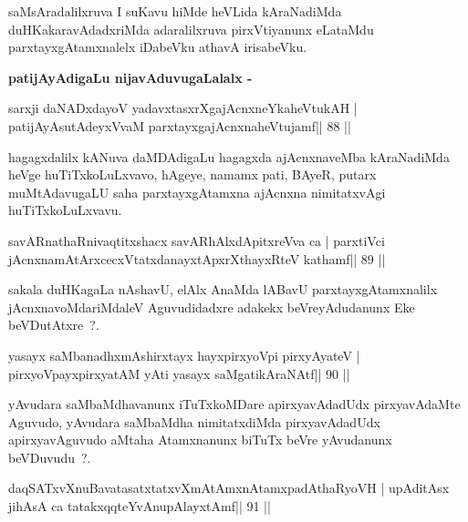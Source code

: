 \begin{artha}
saMsAradalilxruva I suKavu hiMde heVLida kAraNadiMda duHKakaravAdadxriMda adaralilxruva pirxVtiyanunx eLataMdu parxtayxgAtamxnalelx iDabeVku athavA irisabeVku.
\end{artha}

\begin{artha}
\textbf{patijAyAdigaLu nijavAduvugaLalalx -}
\end{artha}

\begin{shl}
sarxji daNADxdayoV yadavxtasxrXgajAcnxneYkaheVtukAH |
patijAyAsutAdeyxVvaM parxtayxgajAcnxnaheVtujamf\hfill || 88 ||
\end{shl}

\begin{artha}
hagagxdalilx kANuva daMDAdigaLu hagagxda ajAcnxnaveMba kAraNadiMda heVge huTiTxkoLuLxvavo, hAgeye, namamx pati, BAyeR, putarx muMtAdavugaLU saha parxtayxgAtamxna ajAcnxna nimitatxvAgi huTiTxkoLuLxvavu.
\end{artha}

\begin{shl}
savARnathaRnivaqtitxshacx savARhAlxdApitxreVva ca |
parxtiVci jAcnxnamAtArxcecxVtatxdanayxtApxrXthayxRteV kathamf\hfill || 89 ||
\end{shl}

\begin{artha}
sakala duHKagaLa nAshavU, elAlx AnaMda lABavU parxtayxgAtamxnalilx
jAcnxnavoMdariMdaleV Aguvudidadxre adakekx beVreyAdudanunx Eke
beVDutAtxre~?.
\end{artha}

\begin{shl}
yasayx saMbanadhxmAshirxtayx hayxpirxyoV\s pi pirxyAyateV |
pirxyoV\s payxpirxyatAM yAti yasayx saMgatikAraNAtf\hfill || 90 ||
\end{shl}

\begin{artha}
yAvudara saMbaMdhavanunx iTuTxkoMDare apirxyavAdadUdx pirxyavAdaMte Aguvudo, yAvudara saMbaMdha nimitatxdiMda pirxyavAdadUdx apirxyavAguvudo aMtaha Atamxnanunx biTuTx beVre yAvudanunx beVDuvudu~?.
\end{artha}


\begin{shl}
daqSATxvX\s nuBavatasatxtatxvXmAtAmxnAtamxpadAthaRyoVH |
upAditAsx jihAsA ca tatakxqqteYvAnupAlayxtAmf\hfill || 91 ||
\end{shl}

